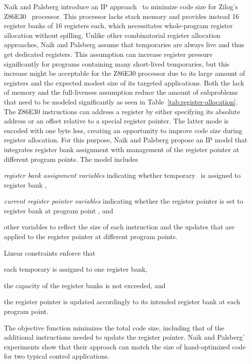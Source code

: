 \documentclass[acmsmall,authorversion,nonacm]{acmart}
\newcommand{\var}[2]{}
\begin{document}
Naik and Palsberg introduce an IP approach~\cite{Naik2002} to minimize
code size for Zilog's Z86E30~\cite{Z86E30} processor.
This processor lacks stack memory and provides instead 16 register
banks of 16 registers each, which necessitates whole-program register
allocation without spilling.
Unlike other combinatorial register allocation approaches, Naik and
Palsberg assume that temporaries are always live and thus get
dedicated registers.
This assumption can increase register pressure significantly for
programs containing many short-lived temporaries, but this increase
might be acceptable for the Z86E30 processor due to its large amount
of registers and the expected modest size of its targeted
applications.
Both the lack of memory and the full-liveness assumption reduce the
amount of subproblems that need to be modeled significantly as seen in
Table~\ref{tab:register-allocation}.
The Z86E30 instructions can address a register by either specifying
its absolute address or an offset relative to a special register
pointer.
The latter mode is encoded with one byte less, creating an opportunity
to improve code size during register allocation.
For this purpose, Naik and Palsberg propose an IP model that
integrates register bank assignment with management of the register
pointer at different program points.
The model includes
\begin{inparaitem}[]
\item \emph{register bank assignment variables} \var{r}{t,b}
  indicating whether temporary~ is assigned to register bank ,
\item \emph{current register pointer variables} \var{rp-val}{p,b}
  indicating whether the register pointer is set to register bank 
  at program point , and
\item other variables to reflect the size of each instruction and the
  updates that are applied to the register pointer at different
  program points.
\end{inparaitem}
Linear constraints enforce that
\begin{inparaitem}[]
\item each temporary is assigned to one register bank,
\item the capacity of the register banks is not exceeded, and
\item the register pointer is updated accordingly to its intended
  register bank at each program point.
\end{inparaitem}
The objective function minimizes the total code size, including that
of the additional instructions needed to update the register pointer.
Naik and Palsberg' experiments show that their approach can match the
size of hand-optimized code for two typical control applications.
\end{document}
